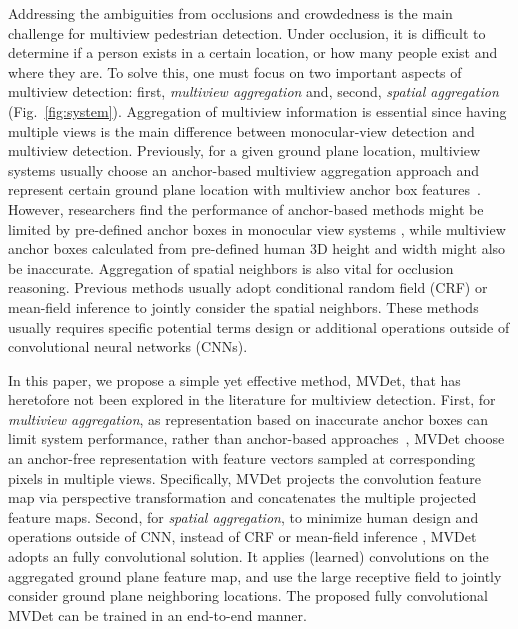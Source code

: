 \documentclass[runningheads]{llncs}
\begin{document}
Addressing the ambiguities from occlusions and crowdedness is the main challenge for multiview pedestrian detection. 
Under occlusion, it is difficult to determine if a person exists in a certain location, or how many people exist and where they are. 
To solve this, one must focus on two important aspects of multiview detection: first, \textit{multiview aggregation} and, second, \textit{spatial aggregation} (Fig.~\ref{fig:system}). 
Aggregation of multiview information is essential since having multiple views is the main difference between monocular-view detection and multiview detection. Previously, for a given ground plane location, multiview systems usually choose an anchor-based multiview aggregation approach and represent certain ground plane location with multiview anchor box features~\cite{chavdarova2017deep,baque2017deep,ku2018joint}. However, researchers find the performance of anchor-based methods might be limited by pre-defined anchor boxes in monocular view systems \cite{zhu2019feature,kong2019foveabox,yang2018metaanchor}, while multiview anchor boxes calculated from pre-defined human 3D height and width might also be inaccurate. 
Aggregation of spatial neighbors is also vital for occlusion reasoning. Previous methods \cite{fleuret2007multicamera,roig2011conditional,baque2017deep} usually adopt conditional random field (CRF) or mean-field inference to jointly consider the spatial neighbors. These methods usually requires specific potential terms design or additional operations outside of convolutional neural networks (CNNs). 


In this paper, we propose a simple yet effective method, MVDet, that has heretofore not been explored in the literature for multiview detection. First, for \textit{multiview aggregation}, as representation based on inaccurate anchor boxes can limit system performance, rather than anchor-based approaches~\cite{chavdarova2017deep,baque2017deep,ku2018joint}, MVDet choose an anchor-free representation with feature vectors sampled at corresponding pixels in multiple views. Specifically, MVDet projects the convolution feature map via perspective transformation and concatenates the multiple projected feature maps. 
Second, for \textit{spatial aggregation}, to minimize human design and operations outside of CNN, instead of CRF or mean-field inference \cite{fleuret2007multicamera,roig2011conditional,baque2017deep}, MVDet adopts an fully convolutional solution. 
It applies (learned) convolutions on the aggregated ground plane feature map, and use the large receptive field to jointly consider ground plane neighboring locations. 
The proposed fully convolutional MVDet can be trained in an end-to-end manner. 
\end{document}
